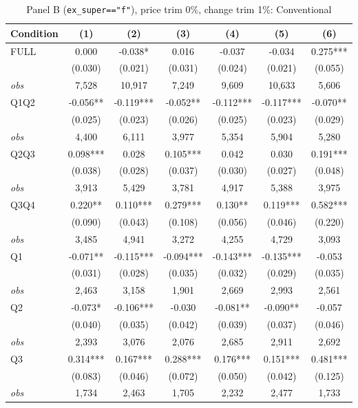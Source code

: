 \documentclass[11pt]{article}
\begin{document}
\begin{table}[!htbp]
\centering
\caption{Panel B (\texttt{ex\_super=="f"}), price trim 0\%, change trim 1\%: Conventional}
\label{tab:b:trim01:conventional}
\small
\begin{tabular}{lcccccc}
\toprule
Condition & (1) & (2) & (3) & (4) & (5) & (6) \\
\midrule
FULL & 0.000 & -0.038* & 0.016 & -0.037 & -0.034 & 0.275*** \\
 & (0.030) & (0.021) & (0.031) & (0.024) & (0.021) & (0.055) \\
\textit{obs} &  7,528 & 10,917 &  7,249 &  9,609 & 10,633 &  5,606 \\
Q1Q2 & -0.056** & -0.119*** & -0.052** & -0.112*** & -0.117*** & -0.070** \\
 & (0.025) & (0.023) & (0.026) & (0.025) & (0.023) & (0.029) \\
\textit{obs} & 4,400 & 6,111 & 3,977 & 5,354 & 5,904 & 5,280 \\
Q2Q3 & 0.098*** & 0.028 & 0.105*** & 0.042 & 0.030 & 0.191*** \\
 & (0.038) & (0.028) & (0.037) & (0.030) & (0.027) & (0.048) \\
\textit{obs} & 3,913 & 5,429 & 3,781 & 4,917 & 5,388 & 3,975 \\
Q3Q4 & 0.220** & 0.110*** & 0.279*** & 0.130** & 0.119*** & 0.582*** \\
 & (0.090) & (0.043) & (0.108) & (0.056) & (0.046) & (0.220) \\
\textit{obs} & 3,485 & 4,941 & 3,272 & 4,255 & 4,729 & 3,093 \\
Q1 & -0.071** & -0.115*** & -0.094*** & -0.143*** & -0.135*** & -0.053 \\
 & (0.031) & (0.028) & (0.035) & (0.032) & (0.029) & (0.035) \\
\textit{obs} & 2,463 & 3,158 & 1,901 & 2,669 & 2,993 & 2,561 \\
Q2 & -0.073* & -0.106*** & -0.030 & -0.081** & -0.090** & -0.057 \\
 & (0.040) & (0.035) & (0.042) & (0.039) & (0.037) & (0.046) \\
\textit{obs} & 2,393 & 3,076 & 2,076 & 2,685 & 2,911 & 2,692 \\
Q3 & 0.314*** & 0.167*** & 0.288*** & 0.176*** & 0.151*** & 0.481*** \\
 & (0.083) & (0.046) & (0.072) & (0.050) & (0.042) & (0.125) \\
\textit{obs} & 1,734 & 2,463 & 1,705 & 2,232 & 2,477 & 1,733 \\

\end{tabular}
\end{table}
\end{document}
